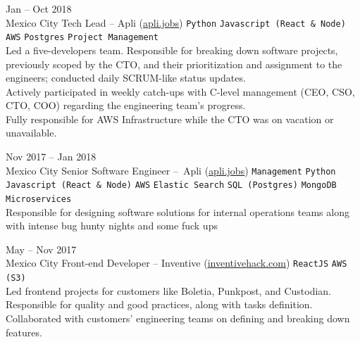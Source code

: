 \documentclass[9pt]{developercv} %
\begin{document}
\begin{entrylist}
    \entry
        {
            Jan -- Oct 2018
            \\\footnotesize{Mexico City}
        }
        {Tech Lead – Apli ({\href{https://apli.jobs/}{\underline{apli.jobs}}})}
        {
            \texttt{Python}
            \slashsep\texttt{Javascript (React \& Node)}
            \slashsep\texttt{AWS}
            \slashsep\texttt{Postgres}
            \slashsep\texttt{Project Management}
        }
        {\\

            Led a five-developers team. Responsible for breaking down software projects, previously 
            scoped by the CTO, and their prioritization and assignment to the engineers; conducted 
            daily SCRUM-like status updates. \\

            Actively participated in weekly catch-ups with C-level management (CEO, CSO, CTO, COO) 
            regarding the engineering team's progress.\\

            Fully responsible for AWS Infrastructure while the CTO was on vacation or unavailable.           
        }

    \entry
        {
            Nov 2017 -- Jan 2018
            \\\footnotesize{Mexico City}
        }
        {Senior Software Engineer – Apli ({\href{https://apli.jobs/}{\underline{apli.jobs}}})}
        {
            \texttt{Management}
            \slashsep\texttt{Python}
            \slashsep\texttt{Javascript (React \& Node)}
            \slashsep\texttt{AWS}
            \slashsep\texttt{Elastic Search}
            \slashsep\texttt{SQL (Postgres)}
            \slashsep\texttt{MongoDB}
            \slashsep\texttt{Microservices}
        }
        {\\
            Responsible for designing software solutions for internal operations teams along with intense bug hunty nights and some fuck ups
        }

    \entry
        {
            May -- Nov 2017
            \\\footnotesize{Mexico City}
        }
        {Front-end Developer – Inventive ({\href{https://www.linkedin.com/company/inventivehack/}{\underline{inventivehack.com}}})}
        { 
            \texttt{ReactJS}
            \slashsep\texttt{AWS (S3)}
        }
        {\\
            Led frontend projects for customers like Boletia, Punkpost, and Custodian. \\
            Responsible for quality and good practices, along with tasks definition. \\
            Collaborated with customers' engineering teams on defining and breaking down features.         
        }


\end{entrylist}
\end{document}
